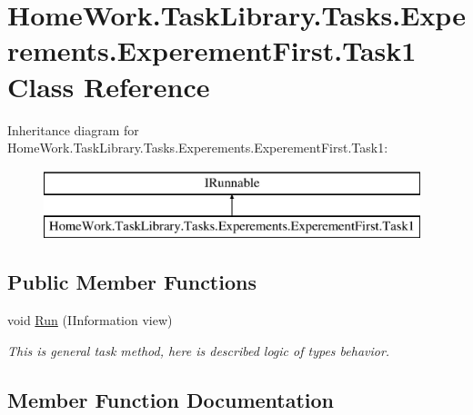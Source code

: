 \hypertarget{class_home_work_1_1_task_library_1_1_tasks_1_1_experements_1_1_experement_first_1_1_task1}{}\section{Home\+Work.\+Task\+Library.\+Tasks.\+Experements.\+Experement\+First.\+Task1 Class Reference}
\label{class_home_work_1_1_task_library_1_1_tasks_1_1_experements_1_1_experement_first_1_1_task1}
Inheritance diagram for Home\+Work.\+Task\+Library.\+Tasks.\+Experements.\+Experement\+First.\+Task1\+:\begin{figure}[H]
\begin{center}
\leavevmode
\includegraphics[height=2.000000cm]{class_home_work_1_1_task_library_1_1_tasks_1_1_experements_1_1_experement_first_1_1_task1}
\end{center}
\end{figure}
\subsection*{Public Member Functions}
\begin{DoxyCompactItemize}
\item 
void \mbox{\hyperlink{class_home_work_1_1_task_library_1_1_tasks_1_1_experements_1_1_experement_first_1_1_task1_a6cbb66fb2425ea0ea35de2df526cdc34}{Run}} (I\+Information view)
\begin{DoxyCompactList}\small\item\em This is general task method, here is described logic of types behavior. \end{DoxyCompactList}\end{DoxyCompactItemize}


\subsection{Member Function Documentation}
\mbox{\label{class_home_work_1_1_task_library_1_1_tasks_1_1_experements_1_1_experement_first_1_1_task1_a6cbb66fb2425ea0ea35de2df526cdc34}} 
